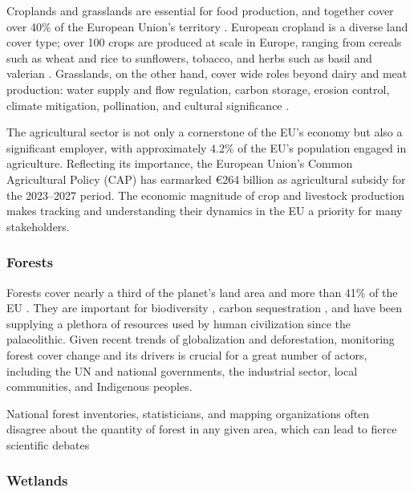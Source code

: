         Croplands and grasslands are essential for food production, and together cover over 40\% of the European Union's territory \citep{eurostat2021land}. European cropland is a diverse land cover type; over 100 crops are produced at scale in Europe, ranging from cereals such as wheat and rice to sunflowers, tobacco, and herbs such as basil and valerian \citep{eurostat2023agricultural}. Grasslands, on the other hand, cover wide roles beyond dairy and meat production: water supply and flow regulation, carbon storage, erosion control, climate mitigation, pollination, and cultural significance \citep{bengtsson2019grasslands}. 
        
        The agricultural sector is not only a cornerstone of the EU's economy but also a significant employer, with approximately 4.2\% of the EU's population engaged in agriculture. Reflecting its importance, the European Union's Common Agricultural Policy (CAP) has earmarked €264 billion as agricultural subsidy for the 2023–2027 period. The economic magnitude of crop and livestock production makes tracking and understanding their dynamics in the EU a priority for many stakeholders.

    \subsubsection*{Forests}

        Forests cover nearly a third of the planet's land area \citep{fao2022,banskota2014forest} and more than 41\% of the EU \citep{eurostat2021land}. They are important for biodiversity \citep{cazzolla2022number}, carbon sequestration \citep{ipcc2021}, and have been supplying a plethora of resources used by human civilization since the palaeolithic. Given recent trends of globalization and deforestation, monitoring forest cover change and its drivers is crucial \citep{sy2019tropical,masolele2024mapping} for a great number of actors, including the UN and national governments, the industrial sector, local communities, and Indigenous peoples.

        National forest inventories, statisticians, and mapping organizations often disagree about the quantity of forest in any given area, which can lead to fierce scientific debates \citep{picard2021recent, korhonen2020new, palahi2021concerns, rossi2019assessing}
    
    \subsubsection*{Wetlands}

